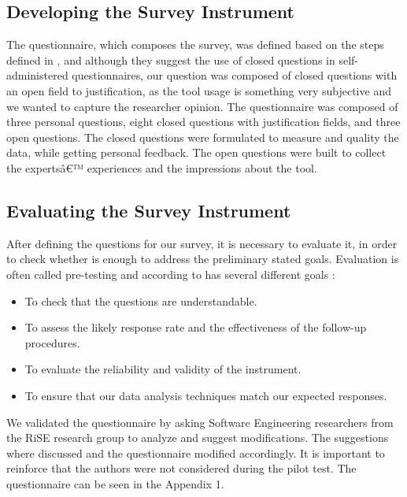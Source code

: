 \subsection{Developing the Survey Instrument}

The  questionnaire,  which  composes  the survey,  was  defined  based  on  the  steps  defined  in \cite{Kitchenham2008} , and although they suggest the  use  of  closed  questions  in  self-administered  questionnaires,  our question was composed of closed questions with an open field to justification,  as the tool usage is something very subjective and we wanted to capture  the  researcher  opinion. The questionnaire was composed of three personal questions, eight  closed questions with justification fields, and three open questions. The closed questions were formulated to measure and quality the data, while getting personal feedback. The open questions were built to collect the expertsâ€™ experiences and the impressions about the tool.


\subsection{Evaluating the Survey Instrument}



After defining the questions for our survey, it is necessary to evaluate it, in order to check whether is enough to address the preliminary stated goals. Evaluation is often called pre-testing and according to \cite{Kitchenham2008} has several different goals :

\begin{itemize}
\item To check that the questions are understandable.
\item To  assess  the  likely  response  rate  and  the  effectiveness  of  the  follow-up procedures.
\item To evaluate the reliability and validity of the instrument.
\item To ensure that our data analysis techniques match our expected responses.
\end{itemize}


We validated the  questionnaire  by  asking Software  Engineering researchers from the RiSE research group to analyze and suggest modifications. The suggestions where discussed and the questionnaire modified accordingly.  It is important to reinforce that the authors were not considered during the pilot test. The questionnaire can be seen in the Appendix 1.



